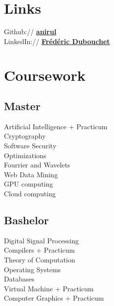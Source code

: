 \documentclass[a4paper]{deedy-resume} %
\begin{document}
\begin{minipage}[t]{0.33\textwidth}
\sectionspace %


\section{Links}

Github:// \href{https://github.com/anirul}
	{\bf anirul} \\
LinkedIn:// \href{https://www.linkedin.com/in/fr\%C3\%A9d\%C3\%A9ric-dubouchet-b885621/}
	{\bf Frédéric Dubouchet} \\

\sectionspace %


\section{Coursework}

\subsection{Master}
	Artificial Intelligence + Practicum \\
	Cryptography \\
	Software Security \\
	Optimizations \\
	Fourrier and Wavelets \\
	Web Data Mining \\
	GPU computing \\
	Cloud computing \\

\sectionspace %


\subsection{Bashelor}
	Digital Signal Processing \\
	Compilers + Practicum \\
	Theory of Computation \\
	Operating Systems \\
	Databases \\
	Virtual Machine + Practicum \\
	Computer Graphics + Practicum \\

\sectionspace %


\end{minipage}%
\end{document}
